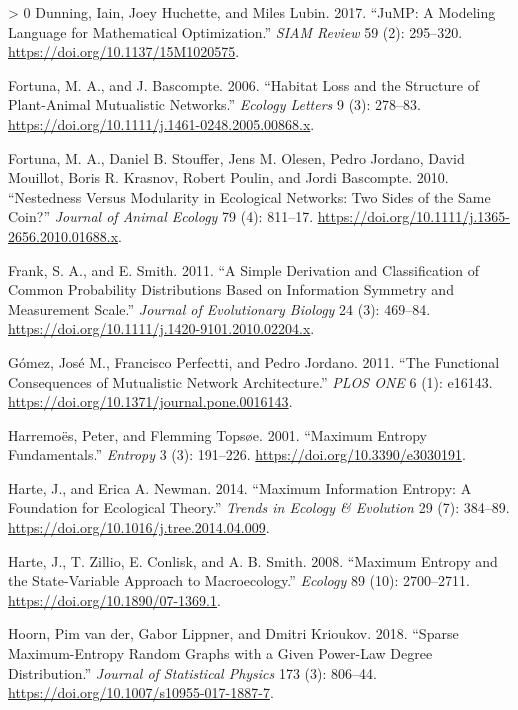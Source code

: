 \documentclass[10pt,oneside]{article}
\newlength{\cslhangindent}
\newenvironment{CSLReferences}[3] %
 {%
  \setlength{\parindent}{0pt}
  \ifodd #1 \everypar{\setlength{\hangindent}{\cslhangindent}}\ignorespaces\fi
  \ifnum #2 > 0
  \setlength{\parskip}{#2\baselineskip}
  \fi
 }%
 {}
\begin{document}
\begin{CSLReferences}{1}{0}
\leavevmode\hypertarget{ref-Dunning2017JumMod}{}%
Dunning, Iain, Joey Huchette, and Miles Lubin. 2017. {``JuMP: A Modeling
Language for Mathematical Optimization.''} \emph{SIAM Review} 59 (2):
295--320. \url{https://doi.org/10.1137/15M1020575}.

\leavevmode\hypertarget{ref-Fortuna2006HabLos}{}%
Fortuna, M. A., and J. Bascompte. 2006. {``Habitat Loss and the
Structure of Plant-Animal Mutualistic Networks.''} \emph{Ecology
Letters} 9 (3): 278--83.
\url{https://doi.org/10.1111/j.1461-0248.2005.00868.x}.

\leavevmode\hypertarget{ref-Fortuna2010NesMod}{}%
Fortuna, M. A., Daniel B. Stouffer, Jens M. Olesen, Pedro Jordano, David
Mouillot, Boris R. Krasnov, Robert Poulin, and Jordi Bascompte. 2010.
{``Nestedness Versus Modularity in Ecological Networks: Two Sides of the
Same Coin?''} \emph{Journal of Animal Ecology} 79 (4): 811--17.
\url{https://doi.org/10.1111/j.1365-2656.2010.01688.x}.

\leavevmode\hypertarget{ref-Frank2011SimDera}{}%
Frank, S. A., and E. Smith. 2011. {``A Simple Derivation and
Classification of Common Probability Distributions Based on Information
Symmetry and Measurement Scale.''} \emph{Journal of Evolutionary
Biology} 24 (3): 469--84.
\url{https://doi.org/10.1111/j.1420-9101.2010.02204.x}.

\leavevmode\hypertarget{ref-Gomez2011FunConb}{}%
Gómez, José M., Francisco Perfectti, and Pedro Jordano. 2011. {``The
Functional Consequences of Mutualistic Network Architecture.''}
\emph{PLOS ONE} 6 (1): e16143.
\url{https://doi.org/10.1371/journal.pone.0016143}.

\leavevmode\hypertarget{ref-Harremoes2001MaxEnt}{}%
Harremoës, Peter, and Flemming Topsøe. 2001. {``Maximum Entropy
Fundamentals.''} \emph{Entropy} 3 (3): 191--226.
\url{https://doi.org/10.3390/e3030191}.

\leavevmode\hypertarget{ref-Harte2014MaxInf}{}%
Harte, J., and Erica A. Newman. 2014. {``Maximum Information Entropy: A
Foundation for Ecological Theory.''} \emph{Trends in Ecology \&
Evolution} 29 (7): 384--89.
\url{https://doi.org/10.1016/j.tree.2014.04.009}.

\leavevmode\hypertarget{ref-Harte2008MaxEnt}{}%
Harte, J., T. Zillio, E. Conlisk, and A. B. Smith. 2008. {``Maximum
Entropy and the State-Variable Approach to Macroecology.''}
\emph{Ecology} 89 (10): 2700--2711.
\url{https://doi.org/10.1890/07-1369.1}.

\leavevmode\hypertarget{ref-vanderHoorn2018SpaMaxa}{}%
Hoorn, Pim van der, Gabor Lippner, and Dmitri Krioukov. 2018. {``Sparse
Maximum-Entropy Random Graphs with a Given Power-Law Degree
Distribution.''} \emph{Journal of Statistical Physics} 173 (3): 806--44.
\url{https://doi.org/10.1007/s10955-017-1887-7}.


\end{CSLReferences}
\end{document}
